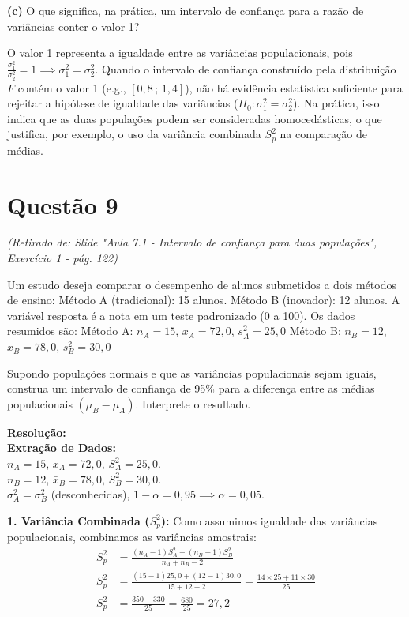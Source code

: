 \documentclass[12pt, a4paper]{article}
\begin{document}
\medskip\noindent\textbf{(c)} O que significa, na prática, um intervalo de confiança para a razão de variâncias conter o valor 1?

\noindent O valor 1 representa a igualdade entre as variâncias populacionais, pois $\frac{\sigma^2_1}{\sigma^2_2} = 1 \implies \sigma^2_1 = \sigma^2_2$. Quando o intervalo de confiança construído pela distribuição $F$ contém o valor 1 (e.g., $[0{,}8 \,;\, 1{,}4]$), não há evidência estatística suficiente para rejeitar a hipótese de igualdade das variâncias ($H_0: \sigma^2_1 = \sigma^2_2$). Na prática, isso indica que as duas populações podem ser consideradas homocedásticas, o que justifica, por exemplo, o uso da variância combinada $S^2_p$ na comparação de médias.


\section*{Questão 9}
\textit{(Retirado de: Slide "Aula 7.1 - Intervalo de confiança para duas populações", Exercício 1 - pág. 122)}

Um estudo deseja comparar o desempenho de alunos submetidos a dois métodos de ensino:
Método A (tradicional): 15 alunos.
Método B (inovador): 12 alunos.
A variável resposta é a nota em um teste padronizado (0 a 100). Os dados resumidos são:
Método A: $n_A = 15$, $\bar{x}_A = 72{,}0$, $s^2_A = 25{,}0$
Método B: $n_B = 12$, $\bar{x}_B = 78{,}0$, $s^2_B = 30{,}0$

\medskip\noindent Supondo populações normais e que as variâncias populacionais sejam iguais, construa um intervalo de confiança de 95\% para a diferença entre as médias populacionais $(\mu_B - \mu_A)$. Interprete o resultado.

\vspace{0.3cm}
\noindent\textbf{Resolução:} \\
\textbf{Extração de Dados:} \\
$n_A = 15$, $\bar{x}_A = 72{,}0$, $S^2_A = 25{,}0$. \\
$n_B = 12$, $\bar{x}_B = 78{,}0$, $S^2_B = 30{,}0$. \\
$\sigma^2_A = \sigma^2_B$ (desconhecidas), $1-\alpha = 0{,}95 \implies \alpha = 0{,}05$.

\noindent \textbf{1. Variância Combinada ($S^2_p$):}
Como assumimos igualdade das variâncias populacionais, combinamos as variâncias amostrais:
\begin{align*}
S^2_p &= \frac{(n_A - 1)S^2_A + (n_B - 1)S^2_B}{n_A + n_B - 2} \\
S^2_p &= \frac{(15 - 1)25{,}0 + (12 - 1)30{,}0}{15 + 12 - 2} = \frac{14 \times 25 + 11 \times 30}{25} \\
S^2_p &= \frac{350 + 330}{25} = \frac{680}{25} = \boxed{27{,}2}
\end{align*}
\end{document}
